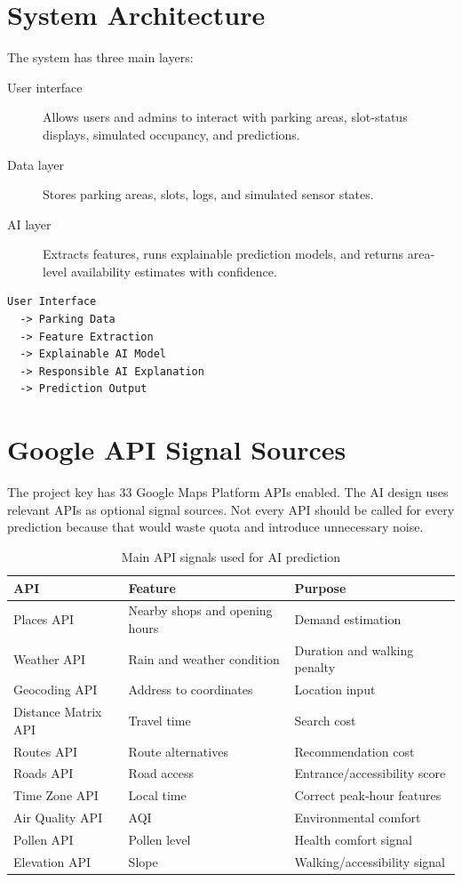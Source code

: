 \documentclass[12pt,a4paper]{article}
\begin{document}
\section{System Architecture}
\label{sec:architecture}

The system has three main layers:

\begin{description}
  \item[User interface] Allows users and admins to interact with parking areas, slot-status displays, simulated occupancy, and predictions.
  \item[Data layer] Stores parking areas, slots, logs, and simulated sensor states.
  \item[AI layer] Extracts features, runs explainable prediction models, and returns area-level availability estimates with confidence.
\end{description}

\begin{lstlisting}
User Interface
  -> Parking Data
  -> Feature Extraction
  -> Explainable AI Model
  -> Responsible AI Explanation
  -> Prediction Output
\end{lstlisting}

\section{Google API Signal Sources}
\label{sec:api-sources}

The project key has 33 Google Maps Platform APIs enabled. The AI design uses relevant APIs as optional signal sources. Not every API should be called for every prediction because that would waste quota and introduce unnecessary noise.

\begin{table}[h]
  \centering
  \caption{Main API signals used for AI prediction}
  \label{tab:api-signals}
  \begin{tabular}{p{}p{}p{}}
    \toprule
    API & Feature & Purpose \\
    \midrule
    Places API & Nearby shops and opening hours & Demand estimation \\
    Weather API & Rain and weather condition & Duration and walking penalty \\
    Geocoding API & Address to coordinates & Location input \\
    Distance Matrix API & Travel time & Search cost \\
    Routes API & Route alternatives & Recommendation cost \\
    Roads API & Road access & Entrance/accessibility score \\
    Time Zone API & Local time & Correct peak-hour features \\
    Air Quality API & AQI & Environmental comfort \\
    Pollen API & Pollen level & Health comfort signal \\
    Elevation API & Slope & Walking/accessibility signal \\
    \bottomrule
  \end{tabular}
\end{table}
\end{document}
